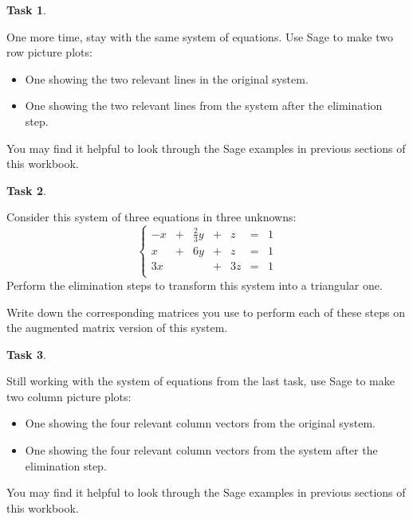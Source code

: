 \documentclass[10pt,]{book}
\theoremstyle{plain}
\theoremstyle{definition}
\numberwithin{equation}{section}
\newtheorem{task}{Task}[chapter]
\begin{document}
\begin{task}
\label{task-51}

      One more time, stay with the same system of equations. Use Sage to make
      two row picture plots:
\begin{itemize}
\item{} One showing the two relevant lines in the original system.\item{} One showing the two relevant lines from the system after the elimination step.\end{itemize}
\par

      You may find it helpful to look through the Sage examples in previous sections
      of this workbook.
\end{task}
\begin{task}
\label{task-52}

      Consider this system of three equations in three unknowns:
      \[
      \left\{
      \begin{array}{rrrrrrr}
      -x &+ &\frac{2}{3} y &+ &z &= &1 \\
       x &+ &           6y &+ &z &= &1 \\
      3x &  &              &+ &3z&= &1 \\
      \end{array}\right.
      \]
      Perform the elimination steps to transform this system into a triangular one.
\par

      Write down the corresponding matrices you use to perform each of these
      steps on the augmented matrix version of this system.
\end{task}
\begin{task}
\label{task-53}

      Still working with the system of equations from the last task, use Sage
      to make two column picture plots:
\begin{itemize}
\item{} One showing the four relevant column vectors from the original system.\item{} One showing the four relevant column vectors from the system after the elimination step.\end{itemize}
\par

      You may find it helpful to look through the Sage examples in previous sections
      of this workbook.
\end{task}
\end{document}
